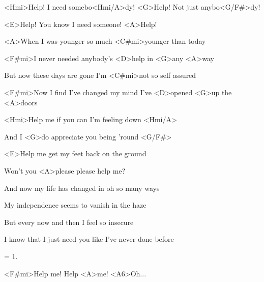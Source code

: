 

<Hmi>Help! I need somebo<Hmi/A>dy! <G>Help! Not just anybo<G/F#>dy!

<E>Help! You know I need someone! <A>Help!

\zs
<A>When I was younger so much <C#mi>younger than today

<F#mi>I never needed anybody's <D>help in <G>any <A>way

But now these days are gone I'm <C#mi>not so self assured

<F#mi>Now I find I've changed my mind I've <D>opened <G>up the <A>doors
\ks

\zr
<Hmi>Help me if you can I'm feeling down <Hmi/A>

And I <G>do appreciate you being 'round <G/F#>

<E>Help me get my feet back on the ground

Won't you <A>please please help me?
\kr

\zs
And now my life has changed in oh so many ways

My independence seems to vanish in the haze

But every now and then I feel so insecure

I know that I just need you like I've never done before
\ks

\zr \kr

\zs
= 1.
\ks

\zr
<F#mi>Help me! Help <A>me! <A6>Oh...
\kr

\kp
